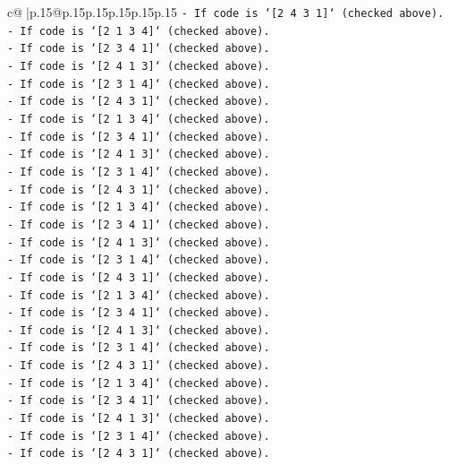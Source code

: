 \documentclass{article}
\begin{document}
{\begin{supertabular}{c@{$\;$}|p{.15\linewidth}@{}p{.15\linewidth}p{.15\linewidth}p{.15\linewidth}p{.15\linewidth}p{.15\linewidth}}
{{{\texttt{{-} If code is `{[}2 4 3 1{]}` (checked above).} \\
\texttt{{-} If code is `{[}2 1 3 4{]}` (checked above).} \\
\texttt{{-} If code is `{[}2 3 4 1{]}` (checked above).} \\
\texttt{{-} If code is `{[}2 4 1 3{]}` (checked above).} \\
\texttt{{-} If code is `{[}2 3 1 4{]}` (checked above).} \\
\texttt{{-} If code is `{[}2 4 3 1{]}` (checked above).} \\
\texttt{{-} If code is `{[}2 1 3 4{]}` (checked above).} \\
\texttt{{-} If code is `{[}2 3 4 1{]}` (checked above).} \\
\texttt{{-} If code is `{[}2 4 1 3{]}` (checked above).} \\
\texttt{{-} If code is `{[}2 3 1 4{]}` (checked above).} \\
\texttt{{-} If code is `{[}2 4 3 1{]}` (checked above).} \\
\texttt{{-} If code is `{[}2 1 3 4{]}` (checked above).} \\
\texttt{{-} If code is `{[}2 3 4 1{]}` (checked above).} \\
\texttt{{-} If code is `{[}2 4 1 3{]}` (checked above).} \\
\texttt{{-} If code is `{[}2 3 1 4{]}` (checked above).} \\
\texttt{{-} If code is `{[}2 4 3 1{]}` (checked above).} \\
\texttt{{-} If code is `{[}2 1 3 4{]}` (checked above).} \\
\texttt{{-} If code is `{[}2 3 4 1{]}` (checked above).} \\
\texttt{{-} If code is `{[}2 4 1 3{]}` (checked above).} \\
\texttt{{-} If code is `{[}2 3 1 4{]}` (checked above).} \\
\texttt{{-} If code is `{[}2 4 3 1{]}` (checked above).} \\
\texttt{{-} If code is `{[}2 1 3 4{]}` (checked above).} \\
\texttt{{-} If code is `{[}2 3 4 1{]}` (checked above).} \\
\texttt{{-} If code is `{[}2 4 1 3{]}` (checked above).} \\
\texttt{{-} If code is `{[}2 3 1 4{]}` (checked above).} \\
\texttt{{-} If code is `{[}2 4 3 1{]}` (checked above).} \\
}}}
\end{supertabular}}
\end{document}

